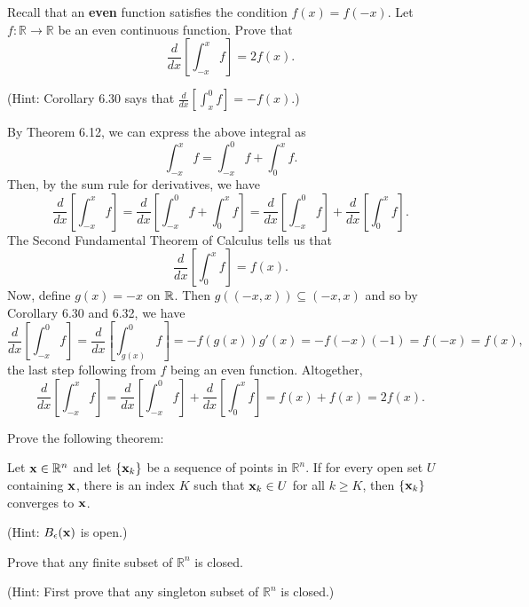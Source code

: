 \documentclass[letterpaper, twoside, 12pt]{book}
\begin{document}
\begin{exercise}[3]
Recall that an \textbf{even} function satisfies the condition \(f(x)=f(-x)\).
Let \(f:\mathbb R\to\mathbb R\) be an even continuous function.
Prove that
\[
  \frac{d}{dx}\left[\int_{-x}^x f\right]=2f(x)
.\]

(Hint: Corollary 6.30 says that \(\frac{d}{dx}[\int_{x}^0f]=-f(x)\).)
\end{exercise}

\begin{solution}
    By Theorem 6.12, we can express the above integral as
    \[ \int_{-x}^{x} f = \int_{-x}^{0} f + \int_{0}^{x} f .\]
    Then, by the sum rule for derivatives, we have
    \[ \frac{d}{dx} \left[\int_{-x}^{x} f \right] = 
    \frac{d}{dx} \left[\int_{-x}^{0} f  + \int_{0}^{x} f \right] =
    \frac{d}{dx} \left[ \int_{-x}^{0} f \right] + 
    \frac{d}{dx} \left[ \int_{0}^{x} f \right] .\]
    The Second Fundamental Theorem of Calculus tells us that 
    \[ \frac{d}{dx} \left[ \int_{0}^{x} f \right] = f(x) .\]
    Now, define \(g(x) = -x\) on \(\mathbb R\). Then 
    \(g((-x, x)) \subseteq (-x, x)\) and so by Corollary 6.30
    and 6.32, we have
    \[ \frac{d}{dx} \left[ \int_{-x}^{0} f \right] = 
       \frac{d}{dx} \left[ \int_{g(x)}^{0} f \right] =
       - f(g(x)) g'(x) = - f(-x) (-1) = f(-x) = f(x) ,\]
    the last step following from \(f\) being an even function. 
    Altogether,
    \[ \frac{d}{dx} \left[\int_{-x}^{x} f \right] = 
       \frac{d}{dx} \left[ \int_{-x}^{0} f \right] + 
       \frac{d}{dx} \left[ \int_{0}^{x} f \right]  = 
       f(x) + f(x) = 2f(x) .\]
\end{solution}

\begin{exercise}[4]
Prove the following theorem:

Let \(\mathbf x\in\mathbb R^n\) and let \(\{\mathbf x_k\}\) be a sequence
of points in \(\mathbb R^n\). If for every open set \(U\)
containing \(\mathbf x\), there is an index \(K\) such that
\(\mathbf x_k\in U\) for all \(k\geq K\),
then \(\{\mathbf x_k\}\) converges to \(\mathbf x\).

(Hint: \(B_\epsilon(\mathbf x)\) is open.)
\end{exercise}
\begin{solution}

\end{solution}

\begin{exercise}[5]
Prove that any finite subset of \(\mathbb R^n\) is closed.

(Hint: First
prove that any singleton subset of \(\mathbb R^n\) is closed.)
\end{exercise}
\begin{solution}

\end{solution}
\end{document}

